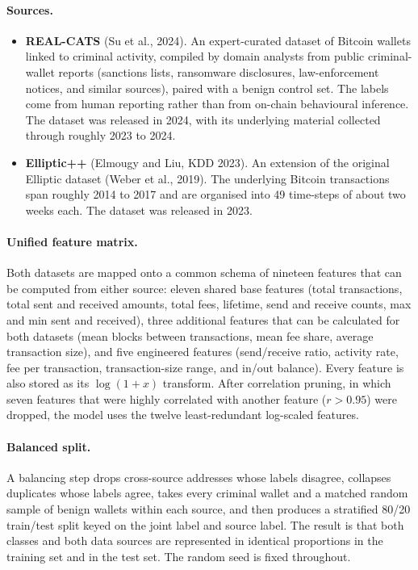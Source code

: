 \documentclass[11pt]{article}
\begin{document}
\paragraph{Sources.}
\begin{itemize}
  \item \textbf{REAL-CATS} (Su et al., 2024). An expert-curated dataset of Bitcoin wallets linked to criminal
        activity, compiled by domain analysts from public criminal-wallet reports (sanctions lists, ransomware
        disclosures, law-enforcement notices, and similar sources), paired with a benign control set. The labels
        come from human reporting rather than from on-chain behavioural inference. The dataset was released in
        2024, with its underlying material collected through roughly 2023 to 2024.
  \item \textbf{Elliptic++} (Elmougy and Liu, KDD 2023). An extension of the original Elliptic dataset (Weber et
        al., 2019). The underlying Bitcoin transactions span roughly 2014 to 2017 and are organised into 49
        time-steps of about two weeks each. The dataset was released in 2023.
\end{itemize}

\paragraph{Unified feature matrix.}
Both datasets are mapped onto a common schema of nineteen features that can be computed from either source: eleven
shared base features (total transactions, total sent and received amounts, total fees, lifetime, send and receive
counts, max and min sent and received), three additional features that can be calculated for both datasets (mean
blocks between transactions, mean fee share, average transaction size), and five engineered features
(send/receive ratio, activity rate, fee per transaction, transaction-size range, and in/out balance). Every
feature is also stored as its $\log(1+x)$ transform. After correlation pruning, in which seven features that were
highly correlated with another feature ($r > 0.95$) were dropped, the model uses the twelve least-redundant
log-scaled features.

\paragraph{Balanced split.}
A balancing step drops cross-source addresses whose labels disagree, collapses duplicates whose labels agree, takes
every criminal wallet and a matched random sample of benign wallets within each source, and then produces a
stratified 80/20 train/test split keyed on the joint label and source label. The result is that both classes and
both data sources are represented in identical proportions in the training set and in the test set. The random
seed is fixed throughout.
\end{document}
